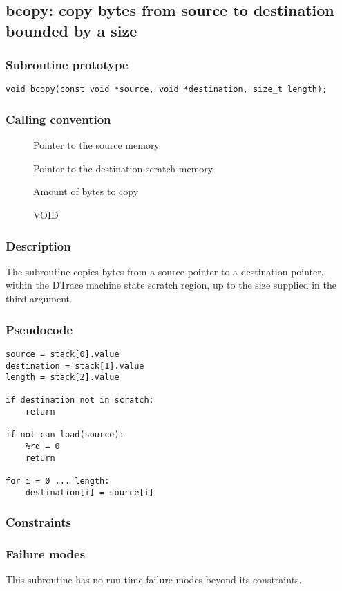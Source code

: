 \clearpage
{}
{}
\label{subr:bcopy}
\subsection*{bcopy: copy bytes from source to destination bounded by a
size}

\subsubsection*{Subroutine prototype}

\begin{verbatim}
void bcopy(const void *source, void *destination, size_t length);
\end{verbatim}

\subsubsection*{Calling convention}

\begin{description}
\item[] Pointer to the source memory
\item[] Pointer to the destination scratch memory
\item[] Amount of bytes to copy
\item[] VOID
\end{description}

\subsubsection*{Description}

The  subroutine copies bytes from a source pointer
to a destination pointer, within the DTrace machine state scratch
region, up to the size supplied in the third argument.
\subsubsection*{Pseudocode}

\begin{verbatim}
source = stack[0].value
destination = stack[1].value
length = stack[2].value

if destination not in scratch:
    return

if not can_load(source):
    %rd = 0
    return

for i = 0 ... length:
    destination[i] = source[i]
\end{verbatim}

\subsubsection*{Constraints}

\subsubsection*{Failure modes}

This subroutine has no run-time failure modes beyond its constraints.
